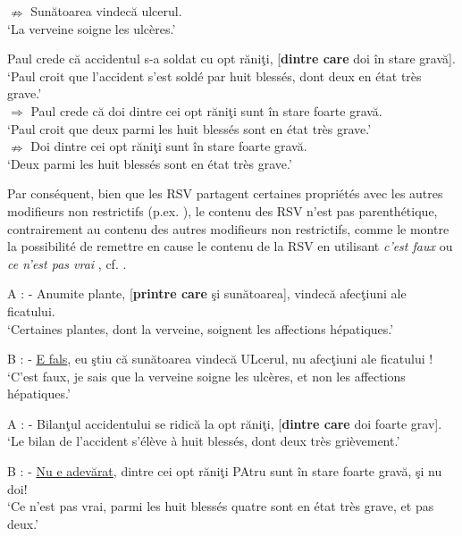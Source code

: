 \ex 
${\nRightarrow}$ Sunătoarea vindecă ulcerul. \label{ch3:ex52c}\\
\glt ‘La verveine soigne les ulcères.’
\z 
\z

\ea \label{ch3:ex53}
\ea 
Paul crede că accidentul s-a soldat cu opt răniţi, [\textbf{dintre care} doi în stare gravă]. \label{ch3:ex53a}\\
\glt ‘Paul croit que l’accident s’est soldé par huit blessés, dont deux en état très grave.’\\

\ex 
${\Rightarrow}$ Paul crede că doi dintre cei opt răniţi sunt în stare foarte gravă. \label{ch3:ex53b}\\
\glt ‘Paul croit que deux parmi les huit blessés sont en état très grave.’ \\

\ex 
${\nRightarrow}$ Doi dintre cei opt răniţi sunt în stare foarte gravă. \label{ch3:ex53c}\\
\glt ‘Deux parmi les huit blessés sont en état très grave.’
\z 
\z

Par conséquent, bien que les RSV partagent certaines propriétés avec les autres modifieurs non restrictifs (p.ex. ), le contenu des RSV n’est pas parenthétique, contrairement au contenu des autres modifieurs non restrictifs, comme le montre la possibilité de remettre en cause le contenu de la RSV en utilisant \textit{c’est faux}  ou \textit{ce n’est pas vrai} , cf. \citet{JayezEtAl2004}. 

\ea \label{ch3:ex54}
\ea 
 A : - Anumite plante, [\textbf{printre care} şi sunătoarea], vindecă afecţiuni ale ficatului. \label{ch3:ex54a}\\  
\glt ‘Certaines plantes, dont la verveine, soignent les affections hépatiques.’

\ex 
B : - \uline{E fals}, eu ştiu că sunătoarea vindecă ULcerul, nu afecţiuni ale ficatului ! \label{ch3:ex54b}\\
\glt ‘C’est faux, je sais que la verveine soigne les ulcères, et non les affections hépatiques.’  
\z 
\z


\ea \label{ch3:ex55} 
\ea 
A : - Bilanţul accidentului se ridică la opt răniţi, [\textbf{dintre care} doi foarte grav]. \label{ch3:ex55a}\\
\glt ‘Le bilan de l’accident s’élève à huit blessés, dont deux très grièvement.’

\ex 
B : - \uline{Nu e adevărat}, dintre cei opt răniţi PAtru sunt în stare foarte gravă, şi nu doi! \label{ch3:ex55b}\\
\glt ‘Ce n’est pas vrai, parmi les huit blessés quatre sont en état très grave, et pas deux.’
\z 
\z


